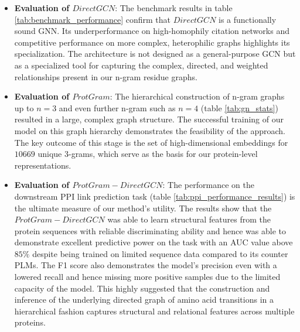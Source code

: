 \documentclass[utf8]{FrontiersinHarvard}
\begin{document}
	\begin{itemize}
		\item \textbf{Evaluation of $DirectGCN$}: The benchmark results in table \ref{tab:benchmark_performance} confirm that $DirectGCN$ is a functionally sound GNN. Its underperformance on high-homophily citation networks and competitive performance on more complex, heterophilic graphs highlights its specialization. The architecture is not designed as a general-purpose GCN but as a specialized tool for capturing the complex, directed, and weighted relationships present in our n-gram residue graphs.
		
		\item \textbf{Evaluation of $ProtGram$}: The hierarchical construction of n-gram graphs up to $n=3$ and even further n-gram such as $n=4$ (table \ref{tab:gn_stats}) resulted in a large, complex graph structure. The successful training of our model on this graph hierarchy demonstrates the feasibility of the approach. The key outcome of this stage is the set of high-dimensional embeddings for $10669$ unique 3-grams, which serve as the basis for our protein-level representations.
		
		\item \textbf{Evaluation of $ProtGram-DirectGCN$}: The performance on the downstream PPI link prediction task (table \ref{tab:ppi_performance_results}) is the ultimate measure of our method's utility.
		The results show that the $ProtGram-DirectGCN$ was able to learn structural features from the protein sequences with reliable discriminating ability and hence was able to demonstrate excellent predictive power on the task with an AUC value above $85\%$ despite being trained on limited sequence data compared to its counter PLMs. The F1 score also demonstrates the model's precision even with a lowered recall and hence missing more positive samples due to the limited capacity of the model. This highly suggested that the construction and inference of the underlying directed graph of amino acid transitions in a hierarchical fashion captures structural and relational features across multiple proteins.
		

\end{itemize}
\end{document}
